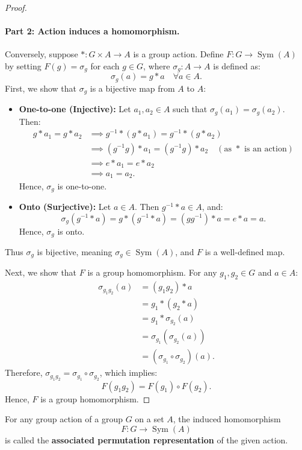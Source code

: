 \begin{proof}
\paragraph{Part 2: Action induces a homomorphism.}
Conversely, suppose $* : G \times A \to A$ is a group action. Define $F : G \to \operatorname{Sym}(A)$ by setting $F(g) = \sigma_g$ for each $g \in G$, where $\sigma_g : A \to A$ is defined as:
\[
\sigma_g(a) = g * a \quad \forall a \in A.
\]
First, we show that $\sigma_g$ is a bijective map from $A$ to $A$:
\begin{itemize}
    \item \textbf{One-to-one (Injective):} Let $a_1, a_2 \in A$ such that $\sigma_g(a_1) = \sigma_g(a_2)$. Then:
    \begin{align*}
    g * a_1 = g * a_2 &\implies g^{-1} * (g * a_1) = g^{-1} * (g * a_2) \\
    &\implies (g^{-1} g) * a_1 = (g^{-1} g) * a_2 \quad (\text{as } * \text{ is an action}) \\
    &\implies e * a_1 = e * a_2 \\
    &\implies a_1 = a_2.
    \end{align*}
    Hence, $\sigma_g$ is one-to-one.
    
    \item \textbf{Onto (Surjective):} Let $a \in A$. Then $g^{-1} * a \in A$, and:
    \[
    \sigma_g(g^{-1} * a) = g * (g^{-1} * a) = (g g^{-1}) * a = e * a = a.
    \]
    Hence, $\sigma_g$ is onto.
\end{itemize}
Thus $\sigma_g$ is bijective, meaning $\sigma_g \in \operatorname{Sym}(A)$, and $F$ is a well-defined map.

Next, we show that $F$ is a group homomorphism. For any $g_1, g_2 \in G$ and $a \in A$:
\begin{align*}
\sigma_{g_1 g_2}(a) &= (g_1 g_2) * a \\
&= g_1 * (g_2 * a) \\
&= g_1 * \sigma_{g_2}(a) \\
&= \sigma_{g_1}(\sigma_{g_2}(a)) \\
&= (\sigma_{g_1} \circ \sigma_{g_2})(a).
\end{align*}
Therefore, $\sigma_{g_1 g_2} = \sigma_{g_1} \circ \sigma_{g_2}$, which implies:
\[
F(g_1 g_2) = F(g_1) \circ F(g_2).
\]
Hence, $F$ is a group homomorphism.
\end{proof}

\begin{remark}
For any group action of a group $G$ on a set $A$, the induced homomorphism
\[
F : G \longrightarrow \operatorname{Sym}(A)
\]
is called the \textbf{associated permutation representation} of the given action.
\end{remark}

